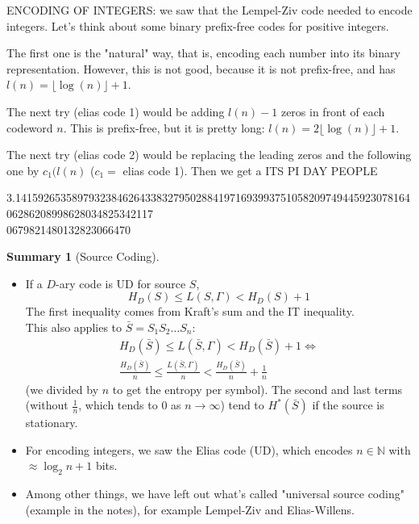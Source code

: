 \documentclass{report}
\theoremstyle{plain}
\theoremstyle{definition}
\newtheorem*{summary}{Summary}
\theoremstyle{remark}
\begin{document}
ENCODING OF INTEGERS: we saw that the Lempel-Ziv code needed to encode integers. Let's think about some binary prefix-free codes for positive integers. \par
The first one is the "natural" way, that is, encoding each number into its binary representation. However, this is not good, because it is not prefix-free, and has $l(n) = \lfloor \log(n) \rfloor + 1$. \par
 The next try (elias code 1) would be adding $l(n) - 1$ zeros in front of each codeword $n$. This is prefix-free, but it is pretty long: $l(n) = 2 \lfloor \log(n) \rfloor + 1$. \par
 The next try (elias code 2) would be replacing the leading zeros and the following one by $c_1(l(n)$ ($c_1 =$ elias code 1). Then we get a ITS PI DAY PEOPLE \par
3.141592653589793238462643383279502884197169399375105820974944592307816406286208998628034825342117\\ 0679821480132823066470

\begin{summary}[Source Coding]
\begin{itemize}
	\item If a $D$-ary code is UD for source $S$,
	\begin{equation*}
		H_D(S) \leq L(S, \Gamma) < H_D(S) + 1
	\end{equation*}
	The first inequality comes from Kraft's sum and the IT inequality. \\
	This also applies to $\bar S = S_1S_2\ldots S_n$:
	\begin{align*}
		H_D(\bar S) \leq L(\bar S, \Gamma) < H_D(\bar S) + 1  \iff \\
		\frac{H_D(\bar S)}{n} \leq \frac{L(\bar S, \Gamma)}{n} < \frac{H_D(\bar S)}{n} + \frac1n
	\end{align*}
	(we divided by $n$ to get the entropy per symbol). The second and last terms (without $\frac1n$, which tends to 0 as $n \to \infty$) tend to $H^*(\bar S)$ if the source is stationary.
	\item For encoding integers, we saw the Elias code (UD), which encodes $n \in \mathbb N$ with $\approx \log_2 n + 1$ bits. 
	\item Among other things, we have left out what's called "universal source coding" (example in the notes), for example Lempel-Ziv and Elias-Willens.
\end{itemize}
\end{summary}
\end{document}
